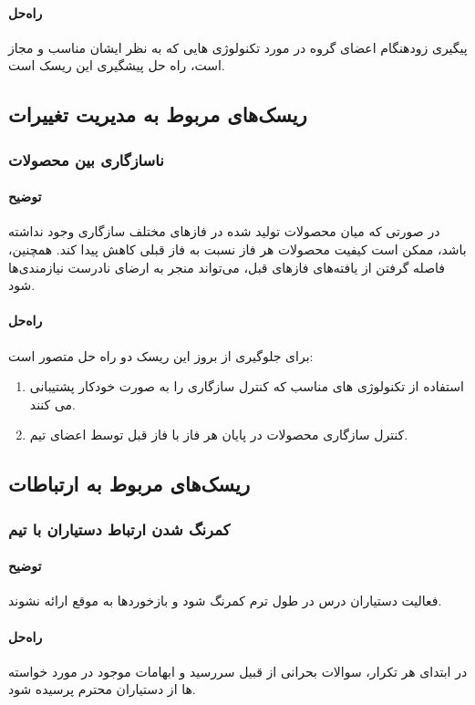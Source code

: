 \paragraph{راه‌حل}
پیگیری زودهنگام اعضای گروه در مورد تکنولوژی هایی که به نظر ایشان مناسب و مجاز است، راه حل پیشگیری این ریسک است.
\subsection{ریسک‌های مربوط به مدیریت تغییرات}
\subsubsection{ناسازگاری بین محصولات}
\paragraph{توضیح}
در صورتی که میان محصولات تولید شده در فازهای مختلف سازگاری وجود نداشته باشد، ممکن است کیفیت محصولات هر فاز نسبت به فاز قبلی کاهش پیدا کند. همچنین، فاصله گرفتن از یافته‌های فازهای قبل، می‌تواند منجر به ارضای نادرست نیازمندی‌ها شود.
\paragraph{راه‌حل}
برای جلوگیری از بروز این ریسک دو راه حل متصور است:
\begin{enumerate}
	\item استفاده از تکنولوژی های مناسب که کنترل سازگاری را به صورت خودکار پشتیبانی می کنند.
	\item کنترل سازگاری محصولات در پایان هر فاز با فاز قبل توسط اعضای تیم.
\end{enumerate}
\subsection{ریسک‌های مربوط به ارتباطات}

\subsubsection{کمرنگ شدن ارتباط دستیاران با تیم}
\paragraph{توضیح}
فعالیت دستیاران درس در طول ترم کمرنگ شود و بازخوردها به موقع ارائه نشوند.
\paragraph{راه‌حل}
در ابتدای هر تکرار، سوالات بحرانی از قبیل سررسید
و ابهامات موجود در مورد خواسته ها از دستیاران محترم پرسیده شود.
